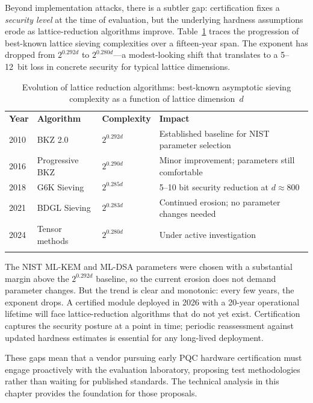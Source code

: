 Beyond implementation attacks, there is a subtler gap: certification fixes a \emph{security level} at the time of evaluation, but the underlying hardness assumptions erode as lattice-reduction algorithms improve.  Table~\ref{tab:lattice-reduction-evolution} traces the progression of best-known lattice sieving complexities over a fifteen-year span.  The exponent has dropped from $2^{0.292d}$ to $2^{0.280d}$---a modest-looking shift that translates to a 5--12~bit loss in concrete security for typical lattice dimensions.

\begin{table}[t]
\caption{Evolution of lattice reduction algorithms: best-known asymptotic sieving complexity as a function of lattice dimension~$d$}
\label{tab:lattice-reduction-evolution}
\begin{tabular}{p{1.5cm}p{3.5cm}p{2.5cm}p{4.5cm}}
\hline\noalign{\smallskip}
\textbf{Year} & \textbf{Algorithm} & \textbf{Complexity} & \textbf{Impact} \\
\noalign{\smallskip}\svhline\noalign{\smallskip}
2010 & BKZ 2.0 & $2^{0.292d}$ & Established baseline for NIST parameter selection \\
2016 & Progressive BKZ & $2^{0.290d}$ & Minor improvement; parameters still comfortable \\
2018 & G6K Sieving & $2^{0.285d}$ & 5--10 bit security reduction at $d \approx 800$ \\
2021 & BDGL Sieving & $2^{0.283d}$ & Continued erosion; no parameter changes needed \\
2024 & Tensor methods & $2^{0.280d}$ & Under active investigation \\
\noalign{\smallskip}\hline
\end{tabular}
\end{table}

The NIST ML-KEM and ML-DSA parameters were chosen with a substantial margin above the $2^{0.292d}$ baseline, so the current erosion does not demand parameter changes.  But the trend is clear and monotonic: every few years, the exponent drops.  A certified module deployed in 2026 with a 20-year operational lifetime will face lattice-reduction algorithms that do not yet exist.  Certification captures the security posture at a point in time; periodic reassessment against updated hardness estimates is essential for any long-lived deployment.

These gaps mean that a vendor pursuing early PQC hardware certification must engage proactively with the evaluation laboratory, proposing test methodologies rather than waiting for published standards.  The technical analysis in this chapter provides the foundation for those proposals.


